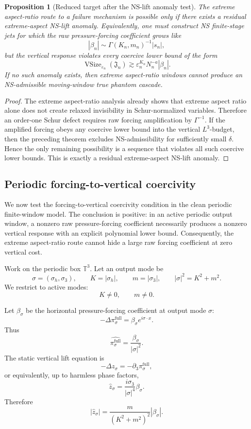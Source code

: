 \documentclass[11pt]{article}
\numberwithin{equation}{section}
\newtheorem{proposition}[theorem]{Proposition}
\begin{document}
\begin{proposition}[Reduced target after the NS-lift anomaly test]
The extreme aspect-ratio route to a failure mechanism is possible only if there exists a residual extreme-aspect NS-lift anomaly. Equivalently, one must construct NS finite-stage jets for which the raw pressure-forcing coefficient grows like
\[
|\beta_n|\sim \Gamma(K_n,m_n)^{-1}|s_n|,
\]
but the vertical response violates every coercive lower bound of the form
\[
\operatorname{VSize}_{\varepsilon_n}(\mathfrak J_n)
\gtrsim
\varepsilon_n^{K_n}N_n^{-a}|\beta_n|.
\]
If no such anomaly exists, then extreme aspect-ratio windows cannot produce an NS-admissible moving-window true phantom cascade.
\end{proposition}

\begin{proof}
The extreme aspect-ratio analysis already shows that extreme aspect ratio alone does not create relaxed invisibility in Schur-normalized variables. Therefore an order-one Schur defect requires raw forcing amplification by \(\Gamma^{-1}\). If the amplified forcing obeys any coercive lower bound into the vertical \(L^3\)-budget, then the preceding theorem excludes NS-admissibility for sufficiently small \(\delta\). Hence the only remaining possibility is a sequence that violates all such coercive lower bounds. This is exactly a residual extreme-aspect NS-lift anomaly.
\end{proof}

\subsection{Periodic forcing-to-vertical coercivity}

We now test the forcing-to-vertical coercivity condition in the clean periodic finite-window model. The conclusion is positive: in an active periodic output window, a nonzero raw pressure-forcing coefficient necessarily produces a nonzero vertical response with an explicit polynomial lower bound. Consequently, the extreme aspect-ratio route cannot hide a large raw forcing coefficient at zero vertical cost.

Work on the periodic box \(\mathbb T^3\). Let an output mode be
\[
\sigma=(\sigma_h,\sigma_3),
\qquad
K=|\sigma_h|,
\qquad
m=|\sigma_3|,
\qquad
|\sigma|^2=K^2+m^2.
\]
We restrict to active modes:
\[
K\neq0,\qquad m\neq0.
\]

Let \(\beta_\sigma\) be the horizontal pressure-forcing coefficient at output mode \(\sigma\):
\[
-\Delta \pi_\sigma^{\mathrm{full}} =
\beta_\sigma e^{i\sigma\cdot x}.
\]
Thus
\[
\widehat{\pi_\sigma^{\mathrm{full}}} =
\frac{\beta_\sigma}{|\sigma|^2}.
\]
The static vertical lift equation is
\[
-\Delta z_\sigma =
-\partial_3\pi_\sigma^{\mathrm{full}},
\]
or equivalently, up to harmless phase factors,
\begin{equation}
\widehat z_\sigma =
\frac{i\sigma_3}{|\sigma|^4}\beta_\sigma.
\label{eq:tag-10-197}
\end{equation}
Therefore
\begin{equation}
|\widehat z_\sigma| =
\frac{m}{(K^2+m^2)^2}|\beta_\sigma|.
\label{eq:tag-10-198}
\end{equation}
\end{document}
